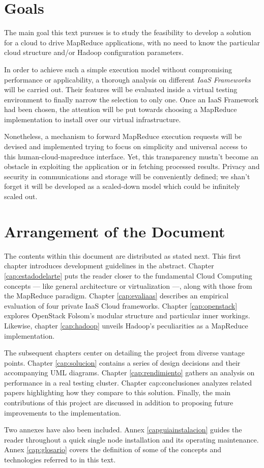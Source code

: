 \section{Goals}\label{sec:objetivos}
\noindent The main goal this text pursues is to study the feasibility to develop a solution for a cloud to drive MapReduce applications, with no need to know the particular cloud structure and/or Hadoop configuration parameters.

In order to achieve such a simple execution model without compromising performance or applicability, a thorough analysis on different \emph{IaaS Frameworks} will be carried out. Their features will be evaluated inside a virtual testing environment to finally narrow the selection to only one. Once an IaaS Framework had been chosen, the attention will be put towards choosing a MapReduce implementation to install over our virtual infrastructure.

Nonetheless, a mechanism to forward MapReduce execution requests will be devised and implemented trying to focus on simplicity and universal access to this human-cloud-mapreduce interface. Yet, this transparency mustn't become an obstacle in exploiting the application or in fetching processed results. Privacy and security in communications and storage will be conveniently defined; we shan't forget it will be developed as a scaled-down model which could be infinitely scaled out.

\section{Arrangement of the Document}\label{sec:organizacion}
\noindent The contents within this document are distributed as stated next. This first chapter introduces development guidelines in the abstract. Chapter \ref{cap:estadodelarte} puts the reader closer to the fundamental Cloud Computing concepts --- like general architecture or virtualization ---, along with those from the MapReduce paradigm. Chapter \ref{cap:evaliaas} describes an empirical evaluation of four private IaaS Cloud frameworks. Chapter \ref{cap:openstack} explores OpenStack Folsom's modular structure and particular inner workings. Likewise, chapter \ref{cap:hadoop} unveils Hadoop's peculiarities as a MapReduce implementation.

The subsequent chapters center on detailing the project from diverse vantage points. Chapter \ref{cap:solucion} contains a series of design decisions and their accompanying UML diagrams. Chapter \ref{cap:rendimiento} gathers an analysis on performance in a real testing cluster. Chapter {cap:conclusiones} analyzes related papers highlighting how they compare to this solution. Finally, the main contributions of this project are discussed in addition to proposing future improvements to the implementation.

Two annexes have also been included. Annex \ref{capguiainstalacion} guides the reader throughout a quick single node installation and its operating maintenance. Annex \ref{cap:glosario} covers the definition of some of the concepts and technologies referred to in this text.
